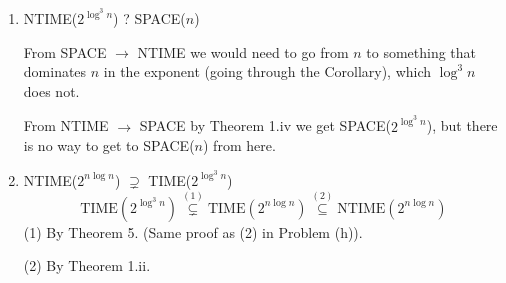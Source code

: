 \documentclass[a4paper]{article}
\begin{document}
\begin{enumerate}[label=(\alph*)]
	\item NTIME($2^{\log^{3}n}$) ? SPACE($n$)

		From SPACE $\to$ NTIME we would need to go from $n$ to something that
		dominates $n$ in the exponent (going through the Corollary), which
		$\log^3 n$ does not.

		From NTIME $\to$ SPACE by Theorem 1.iv we get SPACE($2^{\log^3n}$), but
		there is no way to get to SPACE($n$) from here.


	\item NTIME($2^{n\log n}$) $\supsetneq$ TIME($2^{\log^{3}n}$)
		$$
		\text{TIME}(2^{\log^3n})
		\overset{(1)}{\subsetneq} \text{TIME}(2^{n\log n})
		\overset{(2)}{\subseteq} \text{NTIME}(2^{n\log n})
		$$
		(1) By Theorem 5. (Same proof as (2) in Problem (h)).

		(2) By Theorem 1.ii.
\end{enumerate}
\end{document}
